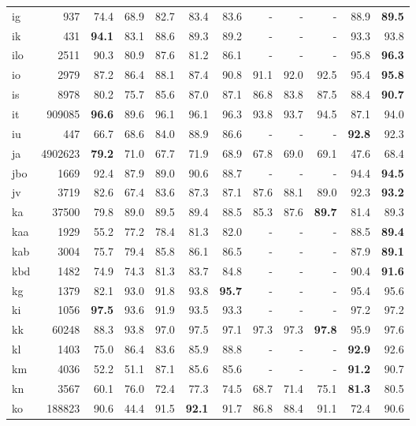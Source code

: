 \documentclass[11pt,a4paper]{article}
\begin{document}
\begin{supertabular}{lrrr|rrr|rrr|rr}
ig & 937 & 74.4 & 68.9 & 82.7 & 83.4 & 83.6 & - & - & - & 88.9 & \textbf{89.5}\\
ik & 431 & \textbf{94.1} & 83.1 & 88.6 & 89.3 & 89.2 & - & - & - & 93.3 & 93.8\\
ilo & 2511 & 90.3 & 80.9 & 87.6 & 81.2 & 86.1 & - & - & - & 95.8 & \textbf{96.3}\\
io & 2979 & 87.2 & 86.4 & 88.1 & 87.4 & 90.8 & 91.1 & 92.0 & 92.5 & 95.4 & \textbf{95.8}\\
is & 8978 & 80.2 & 75.7 & 85.6 & 87.0 & 87.1 & 86.8 & 83.8 & 87.5 & 88.4 & \textbf{90.7}\\
it & 909085 & \textbf{96.6} & 89.6 & 96.1 & 96.1 & 96.3 & 93.8 & 93.7 & 94.5 & 87.1 & 94.0\\
iu & 447 & 66.7 & 68.6 & 84.0 & 88.9 & 86.6 & - & - & - & \textbf{92.8} & 92.3\\
ja & 4902623 & \textbf{79.2} & 71.0 & 67.7 & 71.9 & 68.9 & 67.8 & 69.0 & 69.1 & 47.6 & 68.4\\
jbo & 1669 & 92.4 & 87.9 & 89.0 & 90.6 & 88.7 & - & - & - & 94.4 & \textbf{94.5}\\
jv & 3719 & 82.6 & 67.4 & 83.6 & 87.3 & 87.1 & 87.6 & 88.1 & 89.0 & 92.3 & \textbf{93.2}\\
ka & 37500 & 79.8 & 89.0 & 89.5 & 89.4 & 88.5 & 85.3 & 87.6 & \textbf{89.7} & 81.4 & 89.3\\
kaa & 1929 & 55.2 & 77.2 & 78.4 & 81.3 & 82.0 & - & - & - & 88.5 & \textbf{89.4}\\
kab & 3004 & 75.7 & 79.4 & 85.8 & 86.1 & 86.5 & - & - & - & 87.9 & \textbf{89.1}\\
kbd & 1482 & 74.9 & 74.3 & 81.3 & 83.7 & 84.8 & - & - & - & 90.4 & \textbf{91.6}\\
kg & 1379 & 82.1 & 93.0 & 91.8 & 93.8 & \textbf{95.7} & - & - & - & 95.4 & 95.6\\
ki & 1056 & \textbf{97.5} & 93.6 & 91.9 & 93.5 & 93.3 & - & - & - & 97.2 & 97.2\\
kk & 60248 & 88.3 & 93.8 & 97.0 & 97.5 & 97.1 & 97.3 & 97.3 & \textbf{97.8} & 95.9 & 97.6\\
kl & 1403 & 75.0 & 86.4 & 83.6 & 85.9 & 88.8 & - & - & - & \textbf{92.9} & 92.6\\
km & 4036 & 52.2 & 51.1 & 87.1 & 85.6 & 85.6 & - & - & - & \textbf{91.2} & 90.7\\
kn & 3567 & 60.1 & 76.0 & 72.4 & 77.3 & 74.5 & 68.7 & 71.4 & 75.1 & \textbf{81.3} & 80.5\\
ko & 188823 & 90.6 & 44.4 & 91.5 & \textbf{92.1} & 91.7 & 86.8 & 88.4 & 91.1 & 72.4 & 90.6\\

\end{supertabular}
\end{document}
